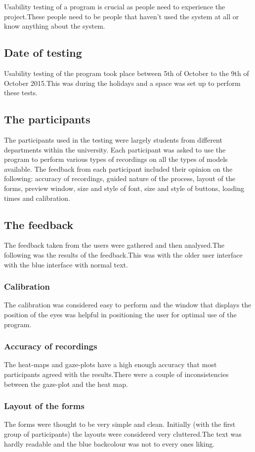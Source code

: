 Usability testing of a program is crucial as people need to experience the project.These people need to be people that haven't used the system at all or know anything about the system.

\subsection{Date of testing}
Usability testing of the program took place between 5th of October to the 9th of October 2015.This was during the holidays and a space was set up to perform these tests.

\subsection{The participants}
The participants used in the testing were largely students from different departments within the university. Each participant was asked to use the program to perform various types of recordings on all the types of models available. The feedback from each participant included their opinion on the following: accuracy of recordings, guided nature of the process, layout of the forms, preview window, size and style of font, size and style of buttons, loading times and calibration.

\subsection{The feedback}
The feedback taken from the users were gathered and then analysed.The following was the results of the feedback.This was with the older user interface with the blue interface with normal text. 

\subsubsection{Calibration}
The calibration was considered easy to perform and the window that displays the position of the eyes was helpful in positioning the user for optimal use of the program.

\subsubsection{Accuracy of recordings}
The heat-maps and gaze-plots have a high enough accuracy that most participants agreed with the results.There were a couple of inconsistencies between the gaze-plot and the heat map.

\subsubsection{Layout of the forms}
The forms were thought to be very simple and clean. Initially (with the first group of participants) the layouts were considered very cluttered.The text was hardly readable and the blue backcolour was not to every ones liking. 

